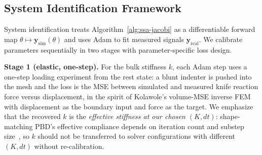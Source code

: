 
\subsection{System Identification Framework}
\label{sec:sysid-framework}

System identification treats Algorithm~\ref{alg:ssa-jacobi} as a
differentiable forward map
$\theta \mapsto \mathbf{y}_{\text{sim}}(\theta)$ and uses Adam to fit
measured signals $\mathbf{y}_{\text{real}}$. We calibrate parameters
sequentially in two stages with parameter-specific loss design.

\textbf{Stage 1 (elastic, one-step).} For the bulk stiffness $k$,
each Adam step uses a one-step loading experiment from the rest
state: a blunt indenter is pushed into the mesh and the loss is the
MSE between simulated and measured knife reaction force versus
displacement, in the spirit of Kolawole's volume-MSE inverse
FEM~\cite{kolawole2023} with displacement as the boundary input and
force as the target. We emphasize that the recovered $k$ is the
\emph{effective stiffness at our chosen $(K, dt)$}: shape-matching
PBD's effective compliance depends on iteration count and substep
size~\cite{macklin2016xpbd}, so $k$ should not be transferred to
solver configurations with different $(K, dt)$ without
re-calibration.

